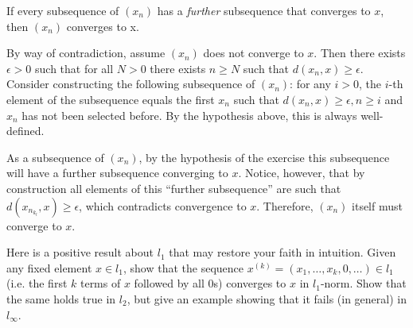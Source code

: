 \begin{exercise}{39}
    If every subsequence of $(x_n)$ has a \textit{further} subsequence that converges to $x$, then $(x_n)$ converges to x.
\end{exercise}

\begin{solution}

    By way of contradiction, assume $(x_n)$ does not converge to $x$.
    Then there exists $\epsilon > 0$ such that for all $N > 0$ there exists $n \geq N$ such that $d(x_n, x) \geq \epsilon$.
    Consider constructing the following subsequence of $(x_n)$: for any $i > 0$, the $i$-th element of the subsequence equals the first $x_n$ such that $d(x_n, x) \geq \epsilon, n \geq i$ and $x_n$ has not been selected before.
    By the hypothesis above, this is always well-defined.

    As a subsequence of $(x_n)$, by the hypothesis of the exercise this subsequence will have a further subsequence converging to $x$.
    Notice, however, that by construction all elements of this ``further subsequence'' are such that $d(x_{n_{k_l}}, x) \geq \epsilon$, which contradicts convergence to $x$.
    Therefore, $(x_n)$ itself must converge to $x$.
\end{solution}

\begin{exercise}{40}
    Here is a positive result about $l_1$ that may restore your faith in intuition.
    Given any fixed element $x \in l_1$, show that the sequence $x^{(k)} = (x_1, \ldots, x_k, 0, \ldots) \in l_1$ (i.e. the first $k$ terms of $x$ followed by all 0s) converges to $x$ in $l_1$-norm.
    Show that the same holds true in $l_2$, but give an example showing that it fails (in general) in $l_{\infty}$.
\end{exercise}

